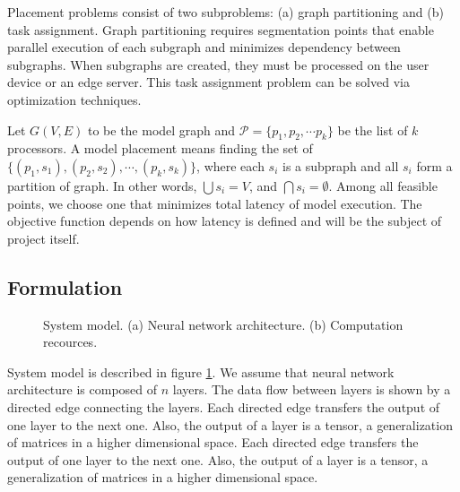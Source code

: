 \documentclass[lettersize,journal]{IEEEtran}
\begin{document}
Placement problems consist of two subproblems: (a) graph partitioning and (b) task assignment. Graph partitioning requires segmentation points that enable parallel execution of each subgraph and minimizes dependency between subgraphs. When subgraphs are created, they must be processed on the user device or an edge server. This task assignment problem can be solved via optimization techniques.

Let $G(V, E)$ to be the model graph and $\mathcal{P} = \{p_1, p_2, \cdots p_k\}$ be the list of $k$ processors. A model placement means finding the set of $\{(p_1, s_1), (p_2, s_2), \cdots, (p_k, s_k)\}$, where each $s_i$ is a subpraph and all $s_i$ form a partition of graph. In other words, $\bigcup s_i = V$, and $\bigcap s_i = \emptyset$. Among all feasible points, we choose one that minimizes total latency of model execution. The objective function depends on how latency is defined and will be the subject of project itself.

\subsection{Formulation}
\begin{figure}[!t]
\centering
{}
\hfil
{}
\caption{System model. (a) Neural network architecture. (b) Computation recources.}
\label{system_model}
\end{figure}
System model is described in figure \ref{system_model}. We assume that neural network architecture is composed of $n$ layers. The data flow between layers is shown by a directed edge connecting the layers. Each directed edge transfers the output of one layer to the next one. Also, the output of a layer is a tensor, a generalization of matrices in a higher dimensional space. Each directed edge transfers the output of one layer to the next one. Also, the output of a layer is a tensor, a generalization of matrices in a higher dimensional space. 
\end{document}
